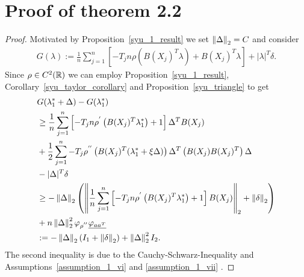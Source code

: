 \section*{Proof of theorem 2.2}


\begin{proof}
  Motivated by Proposition~\ref{syu_1_result}
  we set
  $\left\lVert\Delta\right\rVert_2 = C$ 
  and consider
 \begin{gather}
   G(\lambda)
   :=
      \frac{1}{n}
      \sum_{j = 1}^{n} 
      \left[ 
        -T_j n 
        \rho 
        \left( 
          B(X_j)^T \lambda
        \right)
      +
      B(X_j)^T \lambda
      \right]
      +
      |\lambda|^T \delta.
 \end{gather} 
 Since 
 $\rho \in C^2(\mathbb{R})$
 we can employ 
 Proposition~\ref{syu_1_result},
 Corollary~\ref{syu_taylor_corollary}
 and
 Proposition~\ref{syu_triangle}
 to get
 \begin{align}
  \begin{split}
  & 
  G(\lambda^*_1 + \Delta) 
  -
  G(\lambda^*_1)
  \\
  &\ge
      \frac{1}{n}
      \sum_{j = 1}^{n} 
      \left[ 
        -T_j n 
        \rho^{'} 
        \left( 
          B(X_j)^T \lambda^*_1
        \right)
      +
      1
      \right]
      \Delta^T B(X_j)
      \\
  & +
      \frac{1}{2}
      \sum_{j = 1}^{n} 
        -T_j  
        \rho^{''} 
        \left( 
          B(X_j)^T (\lambda^*_1 + \xi \Delta)
        \right)
        \Delta^T
        \left( 
          B(X_j)
          B(X_j)^T
        \right)
        \Delta
        \\
  &-
      |\Delta|^T \delta
  \\
  &\ge
    - \left\lVert\Delta\right\rVert_2
    \left( 
    \left\lVert
      \frac{1}{n}
      \sum_{j = 1}^{n} 
      \left[ 
        -T_j n 
        \rho^{'} 
        \left( 
          B(X_j)^T \lambda^*_1
        \right)
      +
      1
      \right]
      B(X_j)
    \right\rVert_2
    +
    \left\lVert\delta\right\rVert_2
    \right)
    \\
  &+
  n
  \left\lVert\Delta\right\rVert^2_2
   \varphi_{\rho^{''}}
  \underline{\varphi_{aa^T}}
  \\
  &:=
  -\left\lVert\Delta\right\rVert_2
  (I_1 + \left\lVert\delta\right\rVert_2)
  +
  \left\lVert\Delta\right\rVert^2_2
  I_2
  .
  \end{split}
\end{align}
The second inequality is due to 
the Cauchy-Schwarz-Inequality 
and
Assumptions~\ref{assumption_1_vi} and \ref{assumption_1_vii}
.

\end{proof}
